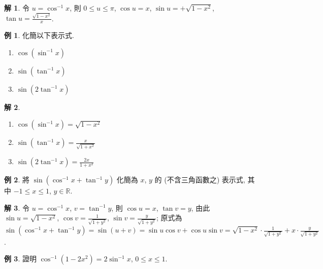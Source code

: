 \documentclass[12pt]{extarticle}
\newcommand{\ds}{\displaystyle}
\theoremstyle{definition}
\newtheorem*{ex}{例}
\newtheorem*{sol}{解}
\begin{document}
\begin{sol}
  令 $\ds u =\cos^{-1}x$, 則 $\ds0\leqslant u\leqslant\pi$, $\cos u = x$, $\ds\sin u = +\sqrt{1 - x^2}$, $\ds\tan u = \frac{\sqrt{1 - x^2}}{x}$. 
\end{sol}

\begin{ex} 化簡以下表示式. 
  \setlength{\columnsep}{-0mm}
  \begin{multicols}{3}
    \begin{enumerate}\setlength\itemsep{0em}
      \item $\cos(\sin^{-1} x)$
      \item $\sin(\tan^{-1} x)$
      \item $\sin(2\tan^{-1} x)$
    \end{enumerate}
  \end{multicols}
\end{ex}

\begin{sol} 
  \setlength{\columnsep}{-0mm}
  \begin{multicols}{3}
  \begin{enumerate}\setlength\itemsep{0em}
    \item $\ds\cos(\sin^{-1} x) = \sqrt{1 - x^2}$
    \item $\ds\sin(\tan^{-1} x) = \frac{x}{\sqrt{1 + x^2}}$
    \item $\ds\sin(2\tan^{-1} x) = \frac{2x}{1 + x^2}$
  \end{enumerate}
  \end{multicols}
\end{sol}

\begin{ex}
  將 $\ds \sin(\cos^{-1} x + \tan^{-1}y)$ 化簡為 $x$, $y$ 的 (不含三角函數之) 表示式, 其中 $-1\leqslant x\leqslant 1$, $y\in\mathbb{R}$. 
\end{ex}

\begin{sol}
  令 $\ds u =\cos^{-1}x$, $\ds v=\tan^{-1} y$, 則 $\cos u = x$, $\tan v = y$, 由此 $\ds\sin u = \sqrt{1 - x^2}$, $\ds\cos v = \frac{1}{\sqrt{1 + y^2}}$, $\ds\sin v = \frac{y}{\sqrt{1 + y^2}}$; 原式為 $\ds\sin(\cos^{-1} x + \tan^{-1}y) = \sin(u + v) = \sin u\cos v + \cos u\sin v = \sqrt{1 - x^2}\cdot\frac{1}{\sqrt{1 + y^2}} + x\cdot\frac{y}{\sqrt{1 + y^2}}$. 
\end{sol}

\begin{ex}
  證明 $\ds\cos^{-1}(1 - 2x^2) = 2\sin^{-1}x$, $0\leqslant x\leqslant 1$. 
\end{ex}
\end{document}
